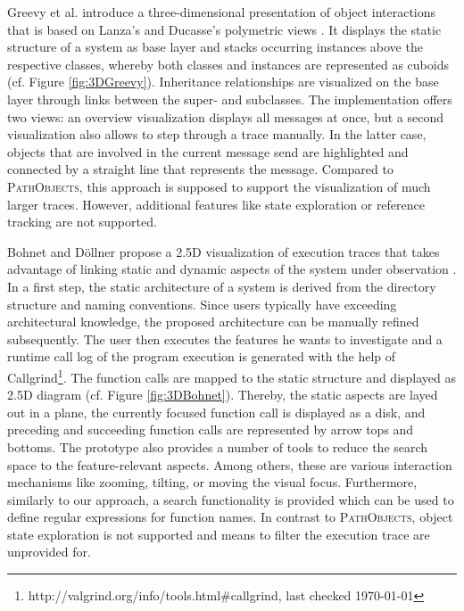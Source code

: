 Greevy et al. introduce a three-dimensional presentation of object interactions \cite{greevy_visualizing_2006} that is based on Lanza's and Ducasse's polymetric views \cite{lanza_polymetric_2003}.
It displays the static structure of a system as base layer and stacks occurring instances above the respective classes, whereby both classes and instances are represented as cuboids (cf. Figure \ref{fig:3DGreevy}).
Inheritance relationships are visualized on the base layer through links between the super- and subclasses.
The implementation offers two views: an overview visualization displays all messages at once, but a second visualization also allows to step through a trace manually.
In the latter case, objects that are involved in the current message send are highlighted and connected by a straight line that represents the message.
Compared to \textsc{PathObjects}, this approach is supposed to support the visualization of much larger traces.
However, additional features like state exploration or reference tracking are not supported.

Bohnet and Döllner propose a 2.5D visualization of execution traces that takes advantage of linking static and dynamic aspects of the system under observation \cite{bohnet_visual_2006}.
In a first step, the static architecture of a system is derived from the directory structure and naming conventions.
Since users typically have exceeding architectural knowledge, the proposed architecture can be manually refined subsequently.
The user then executes the features he wants to investigate and a runtime call log of the program execution is generated with the help of Callgrind\footnote{http://valgrind.org/info/tools.html\#callgrind, last checked \today}.
The function calls are mapped to the static structure and displayed as 2.5D diagram (cf. Figure \ref{fig:3DBohnet}).
Thereby, the static aspects are layed out in a plane, the currently focused function call is displayed as a disk, and preceding and succeeding function calls are represented by arrow tops and bottoms.
The prototype also provides a number of tools to reduce the search space to the feature-relevant aspects.
Among others, these are various interaction mechanisms like zooming, tilting, or moving the visual focus.
Furthermore, similarly to our approach, a search functionality is provided which can be used to define regular expressions for function names.
In contrast to \textsc{PathObjects}, object state exploration is not supported and means to filter the execution trace are unprovided for.

